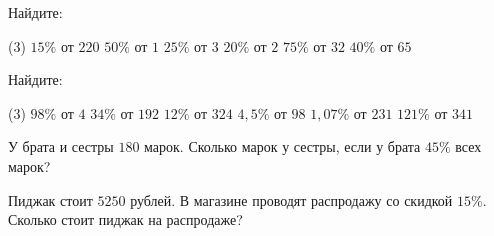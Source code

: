 \begin{homework}[number=3]
	\begin{listofex}
		\item Найдите: \begin{tasks}(3)
			\task \( 15\% \) от \( 220 \)
			\task \( 50\% \) от \( 1 \)
			\task \( 25\% \) от \( 3 \)
			\task \( 20\% \) от \( 2 \)
			\task \( 75\% \) от \( 32 \)
			\task \( 40\% \) от \( 65 \)
		\end{tasks}
	\item Найдите: 
	\begin{tasks}(3)
		\task \( 98\% \) от \( 4 \)
		\task \( 34\% \) от \( 192 \)
		\task \( 12\% \) от \( 324 \)
		\task \( 4,5 \% \) от \( 98 \)
		\task \( 1,07\% \) от \( 231 \)
		\task \( 121\% \) от \( 341 \)
	\end{tasks} 
		\item У брата и сестры \( 180 \) марок. Сколько марок у сестры, если у брата \( 45\% \) всех марок?
		\item  Пиджак стоит \( 5250 \) рублей. В магазине проводят распродажу со скидкой \( 15\% \). Сколько стоит пиджак на распродаже? 
	\end{listofex}
\end{homework}

